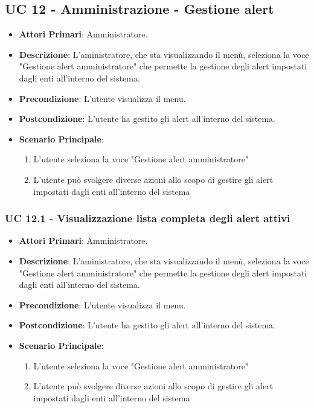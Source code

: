 \subsection{UC 12 - Amministrazione - Gestione alert}
		\begin{itemize}
			\item \textbf{Attori Primari}: Amministratore.
			\item \textbf{Descrizione}: L'aministratore, che sta visualizzando il menù, seleziona la voce "Gestione alert amministratore" che permette la gestione degli alert impostati dagli enti all'interno del sistema.
			\item \textbf{Precondizione}: L'utente visualizza il menu.
			\item \textbf{Postcondizione}: L'utente ha gestito gli alert all'interno del sistema.
			\item \textbf{Scenario Principale}:
			\begin{enumerate}
				\item{L'utente seleziona la voce "Gestione alert amministratore"}
				\item{L'utente può svolgere diverse azioni allo scopo di gestire gli alert impostati dagli enti all'interno del sistema}
			\end{enumerate}	
		\end{itemize}

		\subsubsection{UC 12.1 - Visualizzazione lista completa degli alert attivi}
		\begin{itemize}
			\item \textbf{Attori Primari}: Amministratore.
			\item \textbf{Descrizione}: L'aministratore, che sta visualizzando il menù, seleziona la voce "Gestione alert amministratore" che permette la gestione degli alert impostati dagli enti all'interno del sistema.
			\item \textbf{Precondizione}: L'utente visualizza il menu.
			\item \textbf{Postcondizione}: L'utente ha gestito gli alert all'interno del sistema.
			\item \textbf{Scenario Principale}:
			\begin{enumerate}
				\item{L'utente seleziona la voce "Gestione alert amministratore"}
				\item{L'utente può svolgere diverse azioni allo scopo di gestire gli alert impostati dagli enti all'interno del sistema}
			\end{enumerate}	
		\end{itemize}

